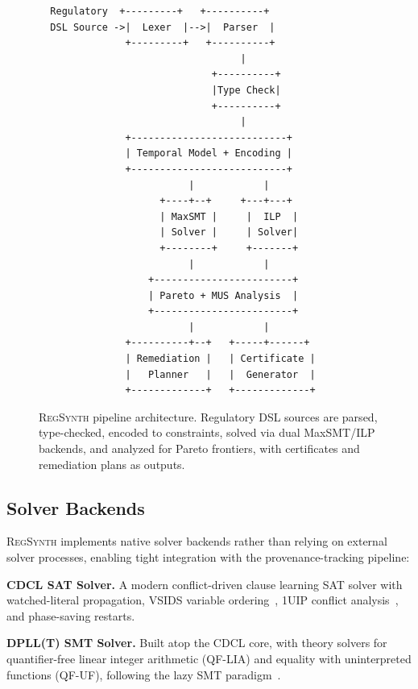 \documentclass[11pt,twocolumn]{article}
\newcommand{\regsynth}{\textsc{RegSynth}}
\begin{document}
\begin{figure}[t]
\centering
\small
\begin{verbatim}
  Regulatory  +---------+   +----------+
  DSL Source ->|  Lexer  |-->|  Parser  |
               +---------+   +----------+
                                   |
                              +----------+
                              |Type Check|
                              +----------+
                                   |
               +---------------------------+
               | Temporal Model + Encoding |
               +---------------------------+
                          |            |
                     +----+--+     +---+---+
                     | MaxSMT |     |  ILP  |
                     | Solver |     | Solver|
                     +--------+     +-------+
                          |            |
                   +------------------------+
                   | Pareto + MUS Analysis  |
                   +------------------------+
                          |            |
               +----------+--+   +-----+------+
               | Remediation |   | Certificate |
               |   Planner   |   |  Generator  |
               +-------------+   +-------------+
\end{verbatim}
\caption{\regsynth{} pipeline architecture. Regulatory DSL sources are parsed,
type-checked, encoded to constraints, solved via dual MaxSMT/ILP backends,
and analyzed for Pareto frontiers, with certificates and remediation plans
as outputs.}
\label{fig:pipeline}
\end{figure}

\subsection{Solver Backends}

\regsynth{} implements native solver backends rather than relying on external
solver processes, enabling tight integration with the provenance-tracking
pipeline:

\textbf{CDCL SAT Solver.} A modern conflict-driven clause learning SAT solver
with watched-literal propagation, VSIDS variable ordering~\cite{chaff2001},
1UIP conflict analysis~\cite{marques2009conflict}, and phase-saving restarts.

\textbf{DPLL(T) SMT Solver.} Built atop the CDCL core, with theory solvers for
quantifier-free linear integer arithmetic (QF-LIA) and equality with uninterpreted
functions (QF-UF), following the lazy SMT paradigm~\cite{demoura2008z3}.
\end{document}
